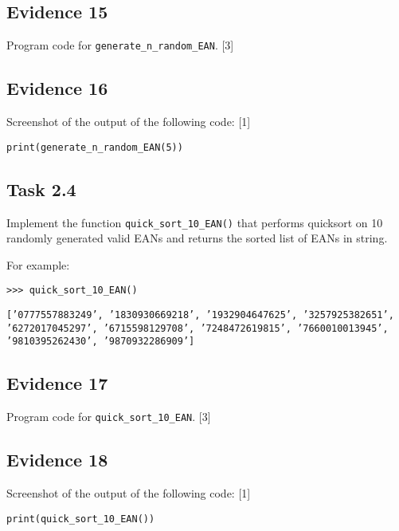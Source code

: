 \subsection*{Evidence 15 }

Program code for \texttt{generate\_n\_random\_EAN}. \hfill{} {[}3{]}

\subsection*{Evidence 16 }

Screenshot of the output of the following code: \hfill{} {[}1{]}

\texttt{print(generate\_n\_random\_EAN(5))} 

\subsection*{Task 2.4}

Implement the function \texttt{quick\_sort\_10\_EAN()} that performs
quicksort on 10 randomly generated valid EANs and returns the sorted
list of EANs in string.

For example: 

\noindent %
\noindent\begin{minipage}[t]{1\columnwidth}%
\texttt{>\textcompwordmark >\textcompwordmark > quick\_sort\_10\_EAN() }

\texttt{{[}'0777557883249', '1830930669218', '1932904647625', '3257925382651',
'6272017045297', '6715598129708', '7248472619815', '7660010013945',
'9810395262430', '9870932286909'{]} }%
\end{minipage}

\subsection*{Evidence 17 }

Program code for \texttt{quick\_sort\_10\_EAN}. \hfill{}{[}3{]}

\subsection*{Evidence 18}

Screenshot of the output of the following code: \hfill{}{[}1{]}

\texttt{print(quick\_sort\_10\_EAN())}